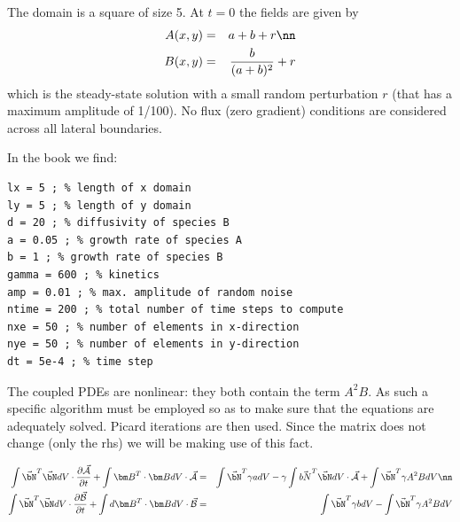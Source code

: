 The domain is a square of size 5. At $t=0$ the fields are given by
\begin{eqnarray}
A(x,y)&=&a+b+r \nn\\
B(x,y)&=& \frac{b}{(a+b)^2} +r
\end{eqnarray}
which is the steady-state solution with a small random perturbation $r$ (that has a maximum amplitude
of 1/100). No flux (zero gradient) conditions are considered across all lateral boundaries.

In the book we find: 
\begin{verbatim}
lx = 5 ; % length of x domain
ly = 5 ; % length of y domain
d = 20 ; % diffusivity of species B
a = 0.05 ; % growth rate of species A
b = 1 ; % growth rate of species B
gamma = 600 ; % kinetics
amp = 0.01 ; % max. amplitude of random noise
ntime = 200 ; % total number of time steps to compute
nxe = 50 ; % number of elements in x-direction
nye = 50 ; % number of elements in y-direction
dt = 5e-4 ; % time step
\end{verbatim}

The coupled PDEs are nonlinear: they both contain the term $A^2B$. As such 
a specific algorithm must be employed so as to make sure that the 
equations are adequately solved. Picard iterations are then used.
Since the matrix does not change (only the rhs) we will be making use of this fact.

\begin{eqnarray}
\int \vec{\bN}^T \vec{\bN} dV \cdot \frac{\partial \vec{\cal A}}{\partial t} + 
\int {\bm B}^T \cdot {\bm B} dV \cdot \vec{\cal A} 
&=& \int \vec{\bN}^T \gamma a dV 
- \gamma\int \vec{bN}^T \vec{\bN} dV \cdot \vec{\cal A}
+ \int \vec{\bN}^T \gamma A^2 B dV \nn\\ 
\int \vec{\bN}^T \vec{\bN} dV \cdot \frac{\partial \vec{\cal B}}{\partial t} + 
\int d {\bm B}^T \cdot {\bm B} dV \cdot \vec{\cal B} 
&=& \int \vec{\bN}^T \gamma b dV 
- \int \vec{\bN}^T \gamma A^2 B dV 
\end{eqnarray}

